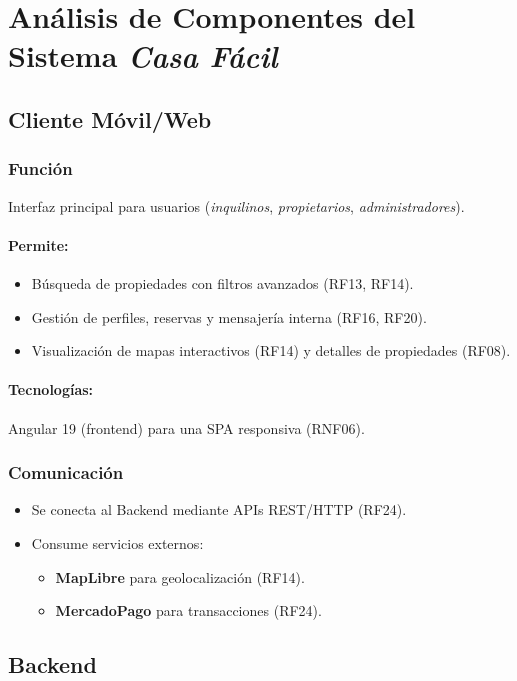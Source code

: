 \section{Análisis de Componentes del Sistema \textit{Casa Fácil}}
	\subsection{Cliente Móvil/Web}
		\subsubsection*{Función}
			Interfaz principal para usuarios (\textit{inquilinos}, \textit{propietarios}, \textit{administradores}).
			\paragraph{Permite:}
			\begin{itemize}
				\item Búsqueda de propiedades con filtros avanzados (RF13, RF14).
				\item Gestión de perfiles, reservas y mensajería interna (RF16, RF20).
				\item Visualización de mapas interactivos (RF14) y detalles de propiedades (RF08).
			\end{itemize}
			
			\paragraph{Tecnologías:} Angular 19 (frontend) para una SPA responsiva (RNF06).
		
		\subsubsection*{Comunicación}
			\begin{itemize}
				\item Se conecta al Backend mediante APIs REST/HTTP (RF24).
				\item Consume servicios externos:
				\begin{itemize}
					\item \textbf{MapLibre} para geolocalización (RF14).
					\item \textbf{MercadoPago} para transacciones (RF24).
				\end{itemize}
			\end{itemize}
	
	\subsection{Backend}
